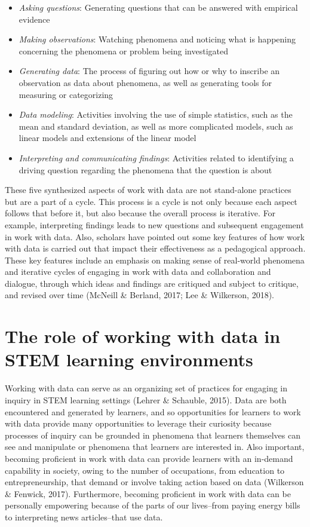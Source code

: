 \documentclass[]{book}
\providecommand{\tightlist}{%
  \setlength{\itemsep}{0pt}\setlength{\parskip}{0pt}}
\theoremstyle{definition}
\theoremstyle{definition}
\theoremstyle{definition}
\theoremstyle{remark}
\begin{document}
\begin{itemize}
\tightlist
\item
  \emph{Asking questions}: Generating questions that can be answered
  with empirical evidence
\item
  \emph{Making observations}: Watching phenomena and noticing what is
  happening concerning the phenomena or problem being investigated
\item
  \emph{Generating data}: The process of figuring out how or why to
  inscribe an observation as data about phenomena, as well as generating
  tools for measuring or categorizing
\item
  \emph{Data modeling}: Activities involving the use of simple
  statistics, such as the mean and standard deviation, as well as more
  complicated models, such as linear models and extensions of the linear
  model
\item
  \emph{Interpreting and communicating findings}: Activities related to
  identifying a driving question regarding the phenomena that the
  question is about
\end{itemize}

These five synthesized aspects of work with data are not stand-alone
practices but are a part of a cycle. This process is a cycle is not only
because each aspect follows that before it, but also because the overall
process is iterative. For example, interpreting findings leads to new
questions and subsequent engagement in work with data. Also, scholars
have pointed out some key features of how work with data is carried out
that impact their effectiveness as a pedagogical approach. These key
features include an emphasis on making sense of real-world phenomena and
iterative cycles of engaging in work with data and collaboration and
dialogue, through which ideas and findings are critiqued and subject to
critique, and revised over time (McNeill \& Berland, 2017; Lee \&
Wilkerson, 2018).

\section{The role of working with data in STEM learning
environments}\label{the-role-of-working-with-data-in-stem-learning-environments}

Working with data can serve as an organizing set of practices for
engaging in inquiry in STEM learning settings (Lehrer \& Schauble,
2015). Data are both encountered and generated by learners, and so
opportunities for learners to work with data provide many opportunities
to leverage their curiosity because processes of inquiry can be grounded
in phenomena that learners themselves can see and manipulate or
phenomena that learners are interested in. Also important, becoming
proficient in work with data can provide learners with an in-demand
capability in society, owing to the number of occupations, from
education to entrepreneurship, that demand or involve taking action
based on data (Wilkerson \& Fenwick, 2017). Furthermore, becoming
proficient in work with data can be personally empowering because of the
parts of our lives--from paying energy bills to interpreting news
articles--that use data.
\end{document}

